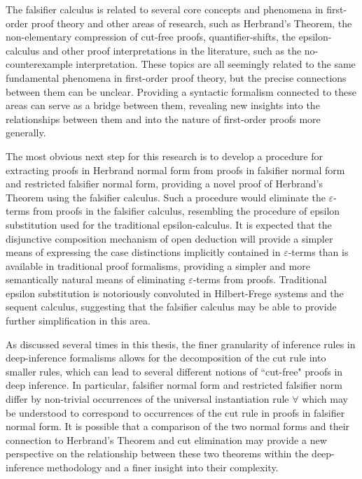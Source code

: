 \documentclass[10pt]{article}
\theoremstyle{definition}\newtheorem{remark}[theorem]{Remark}
\theoremstyle{definition}\newtheorem{example}[theorem]{Example}
\theoremstyle{definition}\newtheorem{definition}[theorem]{Definition}
\begin{document}
	The falsifier calculus is related to several core concepts and phenomena in first-order proof theory and other areas of research, such as Herbrand's Theorem, the non-elementary compression of cut-free proofs, quantifier-shifts, the epsilon-calculus and other proof interpretations in the literature, such as the no-counterexample interpretation. These topics are all seemingly related to the same fundamental phenomena in first-order proof theory, but the precise connections between them can be unclear. Providing a syntactic formalism connected to these areas can serve as a bridge between them, revealing new insights into the relationships between them and into the nature of first-order proofs more generally.
	
	The most obvious next step for this research is to develop a procedure for extracting proofs in Herbrand normal form from proofs in falsifier normal form and restricted falsifier normal form, providing a novel proof of Herbrand's Theorem using the falsifier calculus. Such a procedure would eliminate the $\varepsilon$-terms from proofs in the falsifier calculus, resembling the procedure of epsilon substitution used for the traditional epsilon-calculus. It is expected that the disjunctive composition mechanism of open deduction will provide a simpler means of expressing the case distinctions implicitly contained in $\varepsilon$-terms than is available in traditional proof formalisms, providing a simpler and more semantically natural means of eliminating $\varepsilon$-terms from proofs. Traditional epsilon substitution is notoriously convoluted in Hilbert-Frege systems and the sequent calculus, suggesting that the falsifier calculus may be able to provide further simplification in this area. 
	
	As discussed several times in this thesis, the finer granularity of inference rules in deep-inference formalisms allows for the decomposition of the cut rule into smaller rules, which can lead to several different notions of ``cut-free" proofs in deep inference. In particular, falsifier normal form and restricted falsifier norm differ by non-trivial occurrences of the universal instantiation rule $\forall$ which may be understood to correspond to occurrences of the cut rule in proofs in falsifier normal form. It is possible that a comparison of the two normal forms and their connection to Herbrand's Theorem and cut elimination may provide a new perspective on the relationship between these two theorems within the deep-inference methodology and a finer insight into their complexity.
	
\end{document}
